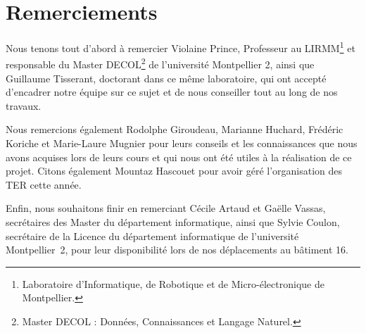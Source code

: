 \chapter*{Remerciements}

Nous tenons tout d'abord à remercier \mbox{Violaine} \mbox{Prince}, Professeur au LIRMM\footnote{Laboratoire d'Informatique, de Robotique et de Micro-électronique de Montpellier.} et responsable du Master DECOL\footnote{Master DECOL : Données, Connaissances et Langage Naturel.} de l'université Montpellier 2, ainsi que \mbox{Guillaume} \mbox{Tisserant}, doctorant dans ce même laboratoire, qui ont accepté d'encadrer notre équipe sur ce sujet et de nous conseiller tout au long de nos travaux.

Nous remercions également \mbox{Rodolphe} \mbox{Giroudeau}, \mbox{Marianne} \mbox{Huchard}, \mbox{Frédéric} \mbox{Koriche} et \mbox{Marie-Laure} \mbox{Mugnier} pour leurs conseils et les connaissances que nous avons acquises lors de leurs cours et qui nous ont été utiles à la réalisation de ce projet. Citons également \mbox{Mountaz} \mbox{Hascouet} pour avoir géré l'organisation des TER cette année.

Enfin, nous souhaitons finir en remerciant \mbox{Cécile} \mbox{Artaud} et \mbox{Gaëlle} \mbox{Vassas}, secrétaires des Master du département informatique, ainsi que \mbox{Sylvie} \mbox{Coulon}, secrétaire de la Licence du département informatique de l'université \mbox{Montpellier~2}, pour leur disponibilité lors de nos déplacements au bâtiment 16.

